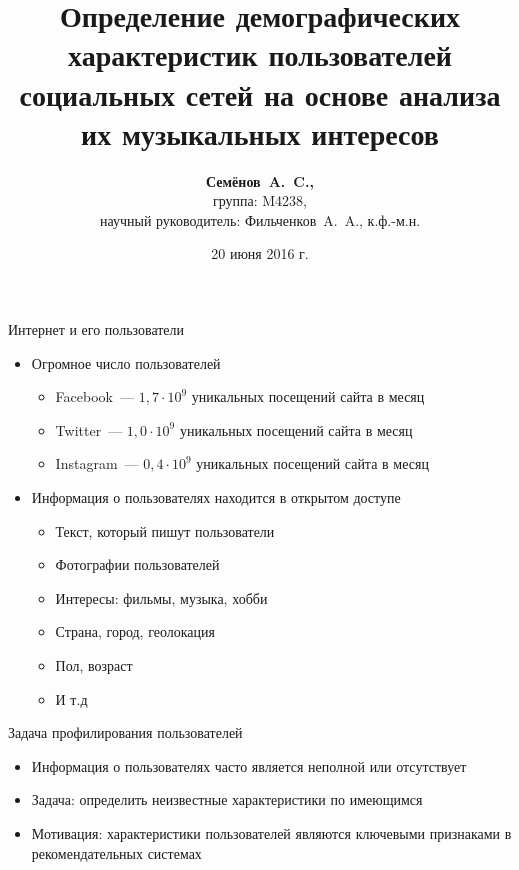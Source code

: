 \documentclass{beamer}
\title{Определение демографических характеристик пользователей
социальных сетей на основе анализа их музыкальных интересов}
\author{\textbf{Семёнов~A.~C.,} \\ 
    группа: M4238, \\
    научный руководитель: Фильченков~A.~A., к.ф.-м.н.}
\institute{Университет ИТМО}
\date{20 июня 2016 г.}
\begin{document}
\begin{frame}
  \titlepage
\end{frame}

\begin{frame}{Интернет и его пользователи}
  \begin{itemize}
      \item {Огромное число пользователей}
          \begin{itemize}
              \item {Facebook~--- $1{,}7 \cdot 10^{9}$ уникальных посещений сайта в месяц}
              \item {Twitter~--- $1{,}0 \cdot 10^{9}$ уникальных посещений сайта в месяц}
              \item {Instagram~--- $0{,}4 \cdot 10^{9}$ уникальных посещений сайта в месяц}
          \end{itemize}
      \item {Информация о пользователях находится в открытом доступе}
          \begin{itemize}
              \item {Текст, который пишут пользователи}
              \item {Фотографии пользователей}
              \item {Интересы: фильмы, музыка, хобби}
              \item {Страна, город, геолокация}
              \item {Пол, возраст}
              \item {И т.д}
          \end{itemize}
  \end{itemize}
\end{frame}

\begin{frame}{Задача профилирования пользователей}
  \begin{itemize}
      \item {Информация о пользователях часто является неполной или отсутствует}
      \item {Задача: определить неизвестные характеристики по имеющимся}
      \item {Мотивация: характеристики пользователей являются
          ключевыми признаками в рекомендательных системах}
  \end{itemize}
\end{frame}
\end{document}
